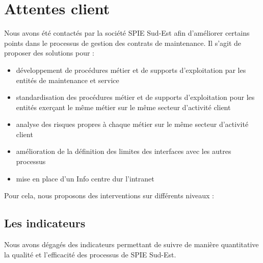 \chapter{Attentes client}

	Nous avons été contactés par la société SPIE Sud-Est afin d'améliorer certains points dans le processus de gestion des contrats de maintenance. Il s'agit de proposer des solutions pour :

    \begin{itemize}
        \item développement de procédures métier et de supports d'exploitation par les entités de maintenance et service
        \item standardisation des procédures métier et de supports d'exploitation pour les entités exerçant le même métier sur le même secteur d'activité client
        \item analyse des risques propres à chaque métier sur le même secteur d'activité client
        \item amélioration de la définition des limites des interfaces avec les autres processus
        \item mise en place d'un Info centre dur l'intranet
    \end{itemize}

    Pour cela, nous proposons des interventions sur différents niveaux :

\section{Les indicateurs}

    Nous avons dégagés des indicateurs permettant de suivre de manière quantitative la qualité et l'efficacité des processus de SPIE Sud-Est.

